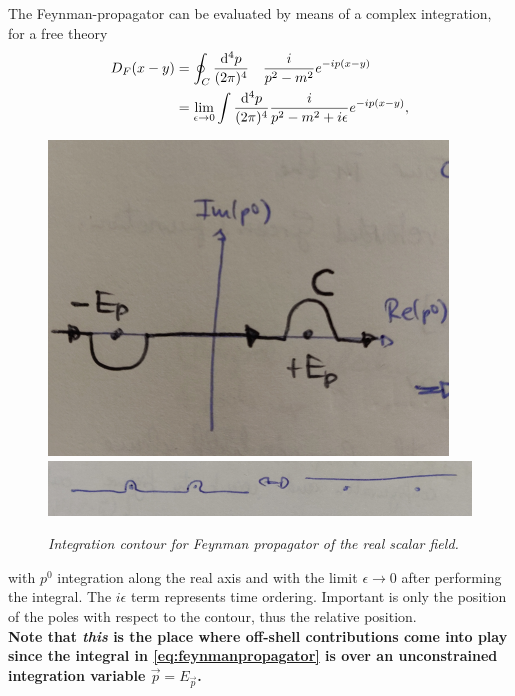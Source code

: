 The Feynman-propagator can be evaluated by means of a complex integration, for a free theory
\begin{align}
	\label{eq:feynmanpropagator}
	D_F(x-y) &= \oint_C \frac{\mathrm{d}^4p}{(2 \pi)^4} \quad \frac{i}{p^2-m^2} e^{-i p(x-y)}\\
	&=\lim_{\epsilon \rightarrow 0} \int \frac{\mathrm{d}^4p}{(2 \pi)^4} \frac{i}{p^2-m^2+i\epsilon} e^{-ip(x-y)},
\end{align}
\begin{figure}
	\centering
	\includegraphics[width=0.3\linewidth]{gfx/Contour1}
	\includegraphics[width=0.7\linewidth]{gfx/Contour2}
	\caption{\itshape Integration contour for Feynman propagator of the real scalar field.}
	\label{fig:contour1}
\end{figure}
with $p^0$ integration along the real axis and with the limit $\epsilon \rightarrow 0$ after performing the integral.
The $i\epsilon$ term represents time ordering. Important is only the position of the poles with respect to the contour, thus the relative position.\\
\textbf{Note that \emph{this} is the place where off-shell contributions come into play since the integral in \ref{eq:feynmanpropagator} is over an unconstrained integration variable $\vec{p} = E_{\vec{p}}$.}

